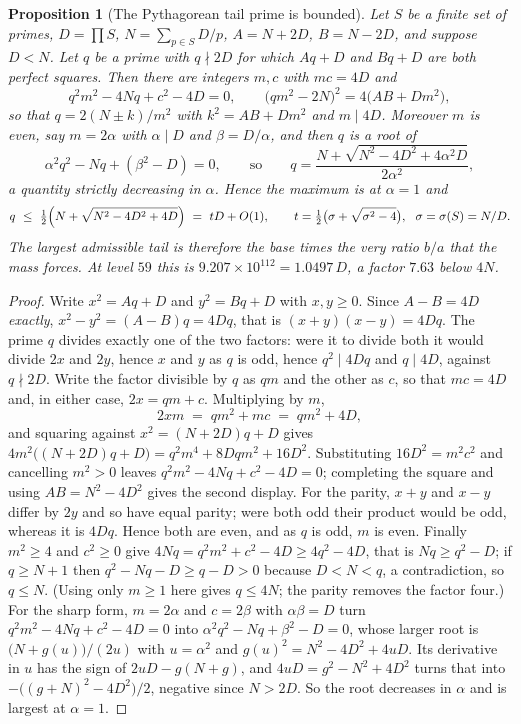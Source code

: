 \documentclass[11pt]{article}
\newtheorem{proposition}[theorem]{Proposition}
\theoremstyle{definition}
\begin{document}
\begin{proposition}[The Pythagorean tail prime is bounded]\label{prop:tailbound}
Let $S$ be a finite set of primes, $D=\prod S$, $N=\sum_{p\in S}D/p$, $A=N+2D$, $B=N-2D$, and suppose
$D<N$. Let $q$ be a prime with $q\nmid 2D$ for which $Aq+D$ and $Bq+D$ are both perfect squares. Then
there are integers $m,c$ with $mc=4D$ and
\[ q^2m^2-4Nq+c^2-4D=0, \qquad \bigl(qm^2-2N\bigr)^2=4\bigl(AB+Dm^2\bigr), \]
so that $q=2(N\pm k)/m^2$ with $k^2=AB+Dm^2$ and $m\mid 4D$. Moreover $m$ is \emph{even}, say
$m=2\alpha$ with $\alpha\mid D$ and $\beta=D/\alpha$, and then $q$ is a root of
\[ \alpha^2q^2-Nq+(\beta^2-D)=0, \qquad\text{so}\qquad
   q=\frac{N+\sqrt{N^2-4D^2+4\alpha^2D}}{2\alpha^2}, \]
a quantity strictly decreasing in $\alpha$. Hence the maximum is at $\alpha=1$ and
\[ q\ \le\ \tfrac12\Bigl(N+\sqrt{N^{2}-4D^{2}+4D}\Bigr)\ =\ tD+O(1),
   \qquad t=\tfrac12\bigl(\sigma+\sqrt{\sigma^{2}-4}\bigr),\ \ \sigma=\sigma(S)=N/D. \]
The largest admissible tail is therefore the base times the very ratio $b/a$ that the mass forces.
At level $59$ this is $9.207\times10^{112}=1.0497\,D$, a factor $7.63$ below $4N$.
\end{proposition}

\begin{proof}
Write $x^2=Aq+D$ and $y^2=Bq+D$ with $x,y\ge0$. Since $A-B=4D$ \emph{exactly},
$x^2-y^2=(A-B)q=4Dq$, that is $(x+y)(x-y)=4Dq$. The prime $q$ divides exactly one of the two factors:
were it to divide both it would divide $2x$ and $2y$, hence $x$ and $y$ as $q$ is odd, hence
$q^2\mid 4Dq$ and $q\mid 4D$, against $q\nmid2D$. Write the factor divisible by $q$ as $qm$ and the
other as $c$, so that $mc=4D$ and, in either case, $2x=qm+c$. Multiplying by $m$,
\[ 2xm\;=\;qm^2+mc\;=\;qm^2+4D, \]
and squaring against $x^2=(N+2D)q+D$ gives
$4m^2\bigl((N+2D)q+D\bigr)=q^2m^4+8Dqm^2+16D^2$. Substituting $16D^2=m^2c^2$ and cancelling $m^2>0$
leaves $q^2m^2-4Nq+c^2-4D=0$; completing the square and using $AB=N^2-4D^2$ gives the second display.
For the parity, $x+y$ and $x-y$ differ by $2y$ and so have equal parity; were both odd their
product would be odd, whereas it is $4Dq$. Hence both are even, and as $q$ is odd, $m$ is even.
Finally $m^2\ge4$ and $c^2\ge0$ give $4Nq=q^2m^2+c^2-4D\ge 4q^2-4D$, that is $Nq\ge q^2-D$; if
$q\ge N+1$ then $q^2-Nq-D\ge q-D>0$ because $D<N<q$, a contradiction, so $q\le N$. (Using only
$m\ge1$ here gives $q\le4N$; the parity removes the factor four.) For the sharp form, $m=2\alpha$ and
$c=2\beta$ with $\alpha\beta=D$ turn $q^2m^2-4Nq+c^2-4D=0$ into $\alpha^2q^2-Nq+\beta^2-D=0$, whose
larger root is $\bigl(N+g(u)\bigr)/(2u)$ with $u=\alpha^2$ and $g(u)^2=N^2-4D^2+4uD$. Its derivative
in $u$ has the sign of $2uD-g(N+g)$, and $4uD=g^2-N^2+4D^2$ turns that into
$-\bigl((g+N)^2-4D^2\bigr)/2$, negative since $N>2D$. So the root decreases in $\alpha$ and is
largest at $\alpha=1$.
\end{proof}
\end{document}
